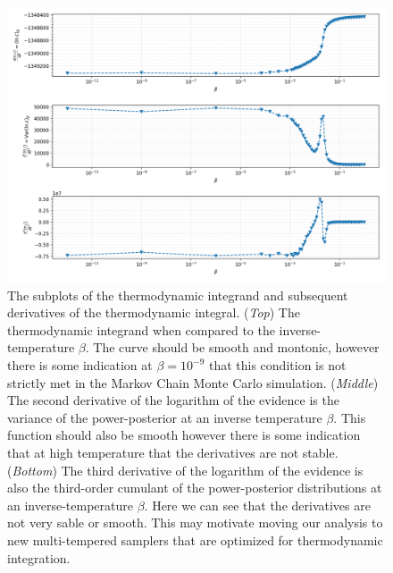 \begin{figure}[th]
\centering
\includegraphics[width=1.0\textwidth]{figs/chapter6/gooseneck_plots_log.png}
\caption{The subplots of the thermodynamic integrand and subsequent derivatives of the thermodynamic integral. (\textit{Top}) The thermodynamic integrand when compared to the inverse-temperature $\beta$. The curve should be smooth and montonic, however there is some indication at $\beta = 10^{-9}$ that this condition is not strictly met in the Markov Chain Monte Carlo simulation. (\textit{Middle}) The second derivative of the logarithm of the evidence is the variance of the power-posterior at an inverse temperature $\beta$. This function should also be smooth however there is some indication that at high temperature that the derivatives are not stable. (\textit{Bottom}) The third derivative of the logarithm of the evidence is also the third-order cumulant of the power-posterior distributions at an inverse-temperature $\beta$. Here we can see that the derivatives are not very sable or smooth. This may motivate moving our analysis to new multi-tempered samplers that are optimized for thermodynamic integration.}
\label{fig:gooseneck_log}
\end{figure}

